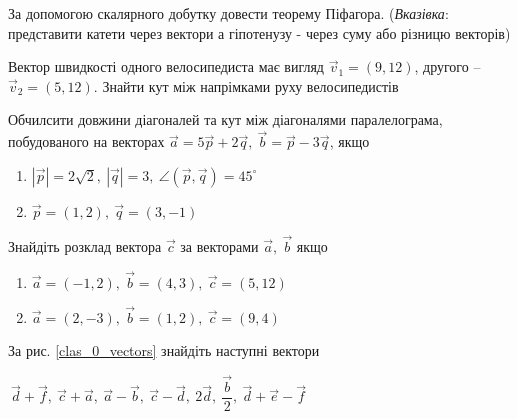 \begin{problem}{12}
	За допомогою скалярного добутку довести теорему Піфагора. (\textit{Вказівка}: представити катети через вектори а гіпотенузу - через суму або різницю векторів)
\end{problem}

\begin{problem}{15}
	Вектор швидкості одного велосипедиста має вигляд $\vec{v}_1 = (9,12)$, другого -- $\vec{v}_2 = (5,12)$. Знайти кут між напрімками руху велосипедистів
\end{problem}

\begin{problem}{13}
	Обчилсити довжини діагоналей та кут між діагоналями паралелограма, побудованого на векторах $\vec{a} = 5\vec{p} + 2\vec{q}, ~\vec{b} = \vec{p}-3\vec{q}$, якщо
	\begin{enumerate}
		\item $|\vec{p}| = 2\sqrt{2}, ~|\vec{q}| = 3, ~\angle(\vec{p},\vec{q}) = 45^{\circ}$
		\item $\vec{p} = (1,2),~ \vec{q} = (3,-1)$
	\end{enumerate}
\end{problem}

\begin{problem}{14}
	Знайдіть розклад вектора $\vec{c}$ за векторами $\vec{a},~\vec{b}$ якщо
	\begin{enumerate}
		\item $\vec{a} = (-1,2),~\vec{b} = (4,3), ~\vec{c} = (5,12)$
		\item $\vec{a} = (2,-3),~\vec{b} = (1,2), ~\vec{c} = (9,4)$
	\end{enumerate}
\end{problem}

\begin{problem}{15}
	За рис. \ref{clas_0_vectors} знайдіть наступні вектори
	
	$~\vec{d}+\vec{f},~\vec{c}+\vec{a}, ~\vec{a}-\vec{b}, ~\vec{c}-\vec{d},~2\vec{d}, ~\dfrac{\vec{b}}{2}, ~\vec{d}+\vec{e}-\vec{f}$
\end{problem}


